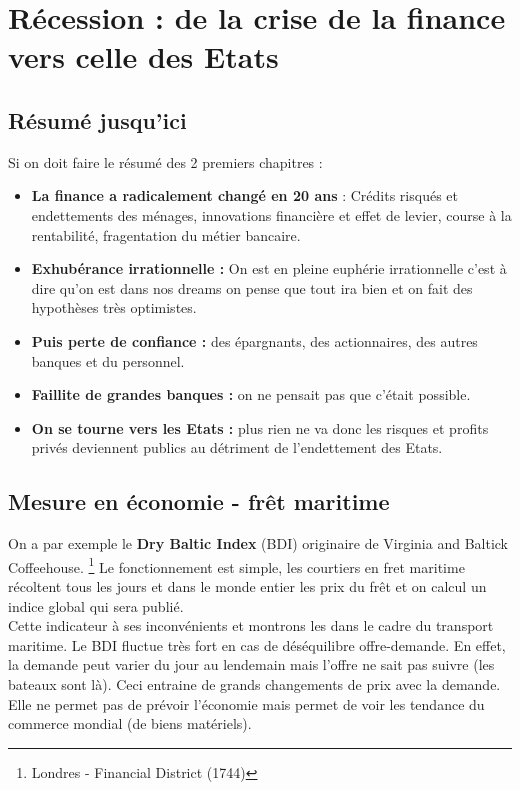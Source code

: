 
\chapter{Récession : de la crise de la finance vers celle des Etats}
\section{Résumé jusqu'ici}
Si on doit faire le résumé des 2 premiers chapitres : 
\begin{itemize}
	\item \textbf{La finance a radicalement changé en 20 ans} : Crédits risqués et endettements des ménages, innovations financière et effet de levier, course à la rentabilité, fragentation du métier bancaire.
	      
	\item \textbf{Exhubérance irrationnelle :} On est en pleine euphérie irrationnelle c'est à dire qu'on est dans nos dreams on pense que tout ira bien et on fait des hypothèses très optimistes.
	      
	\item \textbf{Puis perte de confiance :} des épargnants, des actionnaires, des autres banques et du personnel. 
	      
	\item \textbf{Faillite de grandes banques :} on ne pensait pas que c'était possible. 
	      
	\item \textbf{On se tourne vers les Etats :} plus rien ne va donc les risques et profits privés deviennent publics au détriment de l'endettement des Etats.  
\end{itemize}

\section{Mesure en économie - frêt maritime}
On a par exemple le \textbf{Dry Baltic Index} (BDI) originaire de Virginia and Baltick Coffeehouse. \footnote{Londres - Financial District (1744)} Le fonctionnement est simple, les courtiers en fret maritime récoltent tous les jours et dans le monde entier les prix du frêt et on calcul un indice global qui sera publié.\\
Cette indicateur à ses inconvénients et montrons les dans le cadre du transport maritime. Le BDI fluctue très fort en cas de déséquilibre offre-demande. En effet, la demande peut varier du jour au lendemain mais l'offre ne sait pas suivre (les bateaux sont là). Ceci entraine de grands changements de prix avec la demande. Elle ne permet pas de prévoir l'économie mais permet de voir les tendance du commerce mondial (de biens matériels). 

